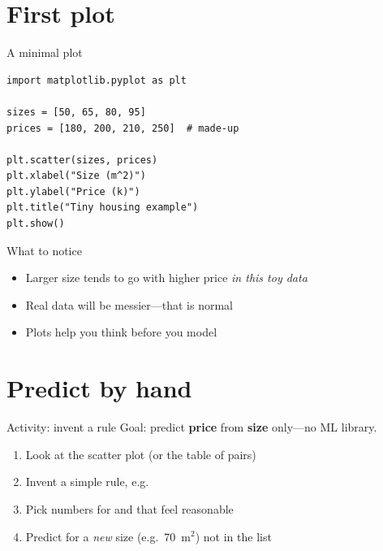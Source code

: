 \documentclass[aspectratio=169,11pt]{beamer}
\begin{document}
    \section{First plot}

    \begin{frame}[fragile]{A minimal plot}
        \begin{lstlisting}
import matplotlib.pyplot as plt

sizes = [50, 65, 80, 95]
prices = [180, 200, 210, 250]  # made-up

plt.scatter(sizes, prices)
plt.xlabel("Size (m^2)")
plt.ylabel("Price (k)")
plt.title("Tiny housing example")
plt.show()
        \end{lstlisting}
    \end{frame}

    \begin{frame}{What to notice}
        \begin{itemize}
            \item Larger size tends to go with higher price \emph{in this toy data}
            \item Real data will be messier---that is normal
            \item Plots help you think before you model
        \end{itemize}
    \end{frame}

    \section{Predict by hand}

    \begin{frame}{Activity: invent a rule}
        Goal: predict \textbf{price} from \textbf{size} only---no ML library.
        \vspace{0.5em}
        \begin{enumerate}
            \item Look at the scatter plot (or the table of pairs)
            \item Invent a simple rule, e.g.\ 
            \item Pick numbers for  and  that feel reasonable
            \item Predict for a \emph{new} size (e.g.\ 70~m$^2$) not in the list
        \end{enumerate}
    \end{frame}
\end{document}
